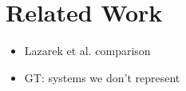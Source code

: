 \section{Related Work}

\begin{itemize}
  \item Lazarek et al. comparison  
  \item  GT: systems we don't represent
\end{itemize}    

